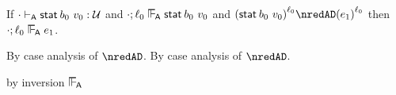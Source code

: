 \begin{lemma}\label{A-sta-label-preservation}
  If\/ $\snil \sWTA \estab{\sbnd_0}{\svalue_0} : \tdyn$
  and\/ $\snil; \sowner_0 \sWLA \estab{\sbnd_0}{\svalue_0}$
  and\/ $\obars{\estab{\sbnd_0}{\svalue_0}}{\sowner_0} \nredAD \obars{\sexpr_1}{\sowner_0}$
  then\/ $\snil; \sowner_0 \sWLA \sexpr_1$.
\end{lemma}{
  \newcommand{\shortproof}{By case analysis of $\nredAD$.}
\begin{lamportproof*}
  \shortproof
\mainproof
  \shortproof

    \begin{pfproof}
      by inversion $\sWLA$
    \end{pfproof}

    \begin{pfproof}
      \qedstep
        \begin{pfproof}
          \begin{mathpar}
          \end{mathpar}
        \end{pfproof}
    \end{pfproof}


\end{lamportproof*}}
